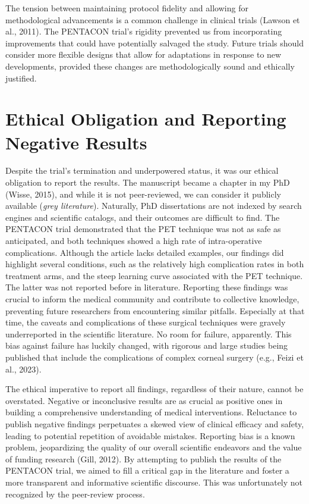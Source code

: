 \documentclass[authordate, empirical]{jote-new-article}
\begin{document}
	The tension between maintaining protocol fidelity and allowing for methodological advancements is a common challenge in clinical trials (Lawson et al., 2011). The PENTACON trial's rigidity prevented us from incorporating improvements that could have potentially salvaged the study. Future trials should consider more flexible designs that allow for adaptations in response to new developments, provided these changes are methodologically sound and ethically justified.



	\section{Ethical Obligation and Reporting Negative Results}



	Despite the trial's termination and underpowered status, it was our ethical obligation to report the results. The manuscript became a chapter in my PhD (Wisse, 2015), and while it is not peer-reviewed, we can consider it publicly available (\emph{grey literature}). Naturally, PhD dissertations are not indexed by search engines and scientific catalogs, and their outcomes are difficult to find. The PENTACON trial demonstrated that the PET technique was not as safe as anticipated, and both techniques showed a high rate of intra-operative complications. Although the article lacks detailed examples, our findings did highlight several conditions, such as the relatively high complication rates in both treatment arms, and the steep learning curve associated with the PET technique. The latter was not reported before in literature. Reporting these findings was crucial to inform the medical community and contribute to collective knowledge, preventing future researchers from encountering similar pitfalls. Especially at that time, the caveats and complications of these surgical techniques were gravely underreported in the scientific literature. No room for failure, apparently. This bias against failure has luckily changed, with rigorous and large studies being published that include the complications of complex corneal surgery (e.g., Feizi et al., 2023).



	The ethical imperative to report all findings, regardless of their nature, cannot be overstated. Negative or inconclusive results are as crucial as positive ones in building a comprehensive understanding of medical interventions. Reluctance to publish negative findings perpetuates a skewed view of clinical efficacy and safety, leading to potential repetition of avoidable mistakes. Reporting bias is a known problem, jeopardizing the quality of our overall scientific endeavors and the value of funding research (Gill, 2012). By attempting to publish the results of the PENTACON trial, we aimed to fill a critical gap in the literature and foster a more transparent and informative scientific discourse. This was unfortunately not recognized by the peer-review process.
\end{document}
